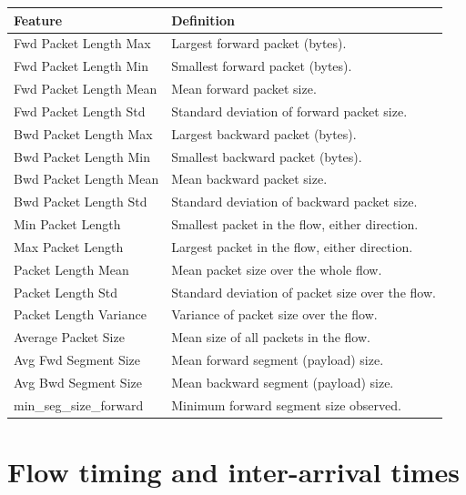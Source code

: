 \begin{tabularx}{\textwidth}{lX}
  \toprule
  \textbf{Feature} & \textbf{Definition} \\
  \midrule
  Fwd Packet Length Max   & Largest forward packet (bytes). \\
  Fwd Packet Length Min   & Smallest forward packet (bytes). \\
  Fwd Packet Length Mean  & Mean forward packet size. \\
  Fwd Packet Length Std   & Standard deviation of forward packet size. \\
  Bwd Packet Length Max   & Largest backward packet (bytes). \\
  Bwd Packet Length Min   & Smallest backward packet (bytes). \\
  Bwd Packet Length Mean  & Mean backward packet size. \\
  Bwd Packet Length Std   & Standard deviation of backward packet size. \\
  Min Packet Length       & Smallest packet in the flow, either direction. \\
  Max Packet Length       & Largest packet in the flow, either direction. \\
  Packet Length Mean      & Mean packet size over the whole flow. \\
  Packet Length Std       & Standard deviation of packet size over the flow. \\
  Packet Length Variance  & Variance of packet size over the flow. \\
  Average Packet Size     & Mean size of all packets in the flow. \\
  Avg Fwd Segment Size    & Mean forward segment (payload) size. \\
  Avg Bwd Segment Size    & Mean backward segment (payload) size. \\
  min\_seg\_size\_forward  & Minimum forward segment size observed. \\
  \bottomrule
\end{tabularx}

\section{Flow timing and inter-arrival times}
\label{app:feat_timing}

